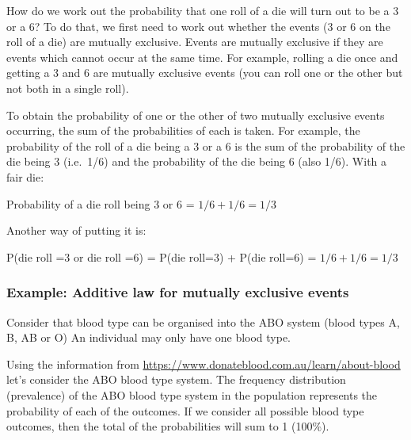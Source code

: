 \documentclass[
]{memoir}
\begin{document}
How do we work out the probability that one roll of a die will turn out to be a 3 or a 6? To do that, we first need to work out whether the events (3 or 6 on the roll of a die) are mutually exclusive. Events are mutually exclusive if they are events which cannot occur at the same time. For example, rolling a die once and getting a 3 and 6 are mutually exclusive events (you can roll one or the other but not both in a single roll).

To obtain the probability of one or the other of two mutually exclusive events occurring, the sum of the probabilities of each is taken. For example, the probability of the roll of a die being a 3 or a 6 is the sum of the probability of the die being 3 (i.e.~1/6) and the probability of the die being 6 (also 1/6). With a fair die:

Probability of a die roll being 3 or 6 = \(1/6 + 1/6 = 1/3\)

Another way of putting it is:

P(die roll =3 or die roll =6) = P(die roll=3) + P(die roll=6) = \(1/6 + 1/6 = 1/3\)

\hypertarget{example-additive-law-for-mutually-exclusive-events}{%
\subsubsection{Example: Additive law for mutually exclusive events}\label{example-additive-law-for-mutually-exclusive-events}}

Consider that blood type can be organised into the ABO system (blood types A, B, AB or O) An individual may only have one blood type.

Using the information from \url{https://www.donateblood.com.au/learn/about-blood} let's consider the ABO blood type system. The frequency distribution (prevalence) of the ABO blood type system in the population represents the probability of each of the outcomes. If we consider all possible blood type outcomes, then the total of the probabilities will sum to 1 (100\%).

 
  \providecommand{\huxb}[2]{\arrayrulecolor[RGB]{#1}\global\arrayrulewidth=#2pt}
  \providecommand{\huxvb}[2]{\color[RGB]{#1}\vrule width #2pt}
  \providecommand{\huxtpad}[1]{\rule{0pt}{#1}}
  \providecommand{\huxbpad}[1]{\rule[-#1]{0pt}{#1}}
\end{document}
